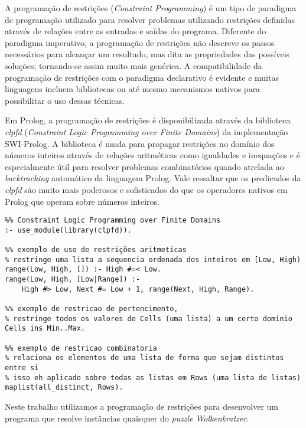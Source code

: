 A programação de restrições (\textit{Constraint Programming}) é um tipo de paradigma de programação utilizado para resolver problemas utilizando restrições definidas através de relações entre as entradas e saídas do programa.
Diferente do paradigma imperativo, a programação de restrições não descreve os passos necessários para alcançar um resultado, mas dita as propriedades das possíveis soluções; tornando-se assim muito mais genérica.
A compatibilidade da programação de restrições com o paradigma declarativo é evidente e muitas linguagens incluem bibliotecas ou até mesmo mecanismos nativos para possibilitar o uso dessas técnicas.

Em Prolog, a programação de restrições é disponibilizada através da biblioteca \textit{clpfd} (\textit{Constraint Logic Programming over Finite Domains}) da implementação SWI-Prolog.
A biblioteca é usada para propagar restrições no domínio dos números inteiros através de relações aritméticas como igualdades e inequações e é especialmente útil para resolver problemas combinatórios quando atrelada ao \textit{backtracking} automático da linguagem Prolog.
Vale ressaltar que os predicados da \textit{clpfd} são muito mais poderosos e sofisticados do que os operadores nativos em Prolog que operam sobre números inteiros.

\begin{verbatim}
%% Constraint Logic Programming over Finite Domains
:- use_module(library(clpfd)).

%% exemplo de uso de restrições aritmeticas
% restringe uma lista a sequencia ordenada dos inteiros em [Low, High)
range(Low, High, []) :- High #=< Low.
range(Low, High, [Low|Range]) :-
    High #> Low, Next #= Low + 1, range(Next, High, Range).

%% exemplo de restricao de pertencimento,
% restringe todos os valores de Cells (uma lista) a um certo dominio
Cells ins Min..Max.

%% exemplo de restricao combinatoria
% relaciona os elementos de uma lista de forma que sejam distintos entre si
% isso eh aplicado sobre todas as listas em Rows (uma lista de listas)
maplist(all_distinct, Rows).
\end{verbatim}

Neste trabalho utilizamos a programação de restrições para desenvolver um programa que resolve instâncias quaisquer do \textit{puzzle} \textit{Wolkenkratzer}.
